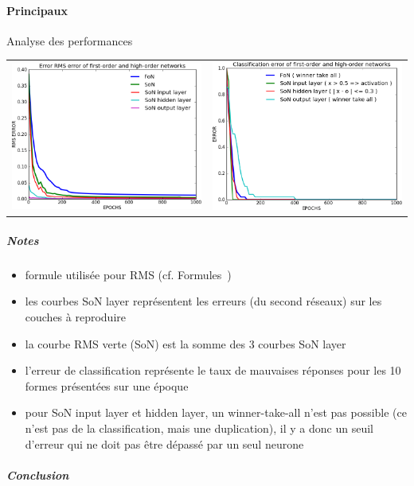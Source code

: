     \paragraph{Principaux}
      Analyse des performances
      \begin{center}
	\begin{tabular}{lr}
	  \hspace*{-1cm}
	  \includegraphics[width=250px]{data/expA2/rms.png}
	  &
	  \includegraphics[width=250px]{data/expA2/err.png} 
	\end{tabular}
      \end{center}
      \subparagraph{Notes}
	\begin{itemize}
	  \item formule utilisée pour RMS (cf. Formules~)
	  \item les courbes SoN layer représentent les erreurs (du second réseaux) sur les couches à reproduire 
	  \item la courbe RMS verte (SoN) est la somme des 3 courbes SoN layer
	  \item l'erreur de classification représente le taux de mauvaises réponses pour les 10 formes présentées sur une époque
	  \item pour SoN input layer et hidden layer, un winner-take-all n'est pas possible (ce n'est pas de la classification, 
	  mais une duplication), il y a donc un seuil d'erreur qui ne doit pas être dépassé par un seul neurone
	\end{itemize}
      \subparagraph{Conclusion}
